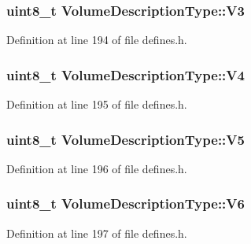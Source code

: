 \subsubsection[{\texorpdfstring{V3}{V3}}]{\setlength{\rightskip}{0pt plus 5cm}uint8\+\_\+t Volume\+Description\+Type\+::\+V3}\hypertarget{structVolumeDescriptionType_a2a6a98d42bff4b72a02f562f1be113d2}{}\label{structVolumeDescriptionType_a2a6a98d42bff4b72a02f562f1be113d2}


Definition at line 194 of file defines.\+h.

\subsubsection[{\texorpdfstring{V4}{V4}}]{\setlength{\rightskip}{0pt plus 5cm}uint8\+\_\+t Volume\+Description\+Type\+::\+V4}\hypertarget{structVolumeDescriptionType_ad10e9650afd43567c2b3b709d72f5dec}{}\label{structVolumeDescriptionType_ad10e9650afd43567c2b3b709d72f5dec}


Definition at line 195 of file defines.\+h.

\subsubsection[{\texorpdfstring{V5}{V5}}]{\setlength{\rightskip}{0pt plus 5cm}uint8\+\_\+t Volume\+Description\+Type\+::\+V5}\hypertarget{structVolumeDescriptionType_a986e346428396e0c131a9f200f472716}{}\label{structVolumeDescriptionType_a986e346428396e0c131a9f200f472716}


Definition at line 196 of file defines.\+h.

\subsubsection[{\texorpdfstring{V6}{V6}}]{\setlength{\rightskip}{0pt plus 5cm}uint8\+\_\+t Volume\+Description\+Type\+::\+V6}\hypertarget{structVolumeDescriptionType_a3f925228651ced5c0e7c373ec6573162}{}\label{structVolumeDescriptionType_a3f925228651ced5c0e7c373ec6573162}


Definition at line 197 of file defines.\+h.

